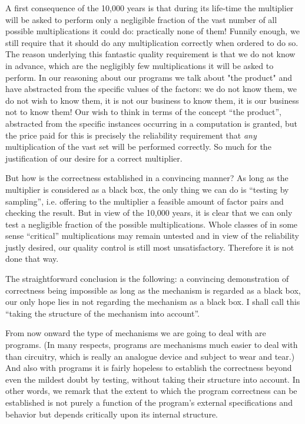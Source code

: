 A first consequence of the 10,000 years is that during its life-time the multiplier will be asked to perform only a negligible fraction of the vast number of all possible multiplications it could do: practically none of them! Funnily enough, we still require that it should do any multiplication correctly when ordered to do so. The reason underlying this fantastic quality requirement is that we do not know in advance, which are the negligibly few multiplications it will be asked to perform. In our reasoning about our programs we talk about "the product" and have abstracted from the specific values of the factors: we do not know them, we do not wish to know them, it is not our business to know them, it is our business not to know them! Our wish to think in terms of the concept ``the product'', abstracted from the specific instances occurring in a computation is granted, but the price paid for this is precisely the reliability requirement that \textit{any} multiplication of the vast set will be performed correctly. So much for the justification of our desire for a correct multiplier.

But how is the correctness established in a convincing manner? As long as the multiplier is considered as a black box, the only thing we can do is ``testing by sampling'', i.e. offering to the multiplier a feasible amount of factor pairs and checking the result. But in view of the 10,000 years, it is clear that we can only test a negligible fraction of the possible multiplications. Whole classes of in some sense ``critical'' multiplications may remain untested and in view of the reliability justly desired, our quality control is still most unsatisfactory. Therefore it is not done that way.

The straightforward conclusion is the following: a convincing demonstration of correctness being impossible as long as the mechanism is regarded
as a black box, our only hope lies in not regarding the mechanism as a black box. I shall call this ``taking the structure of the mechanism into account''.

From now onward the type of mechanisms we are going to deal with are programs. (In many respects, programs are mechanisms much easier to deal
with than circuitry, which is really an analogue device and subject to wear and tear.) And also with programs it is fairly hopeless to establish the correctness beyond even the mildest doubt by testing, without taking their structure into account. In other words, we remark that the extent to which the program correctness can be established is not purely a function of the program's external specifications and behavior but depends critically upon its internal structure.

